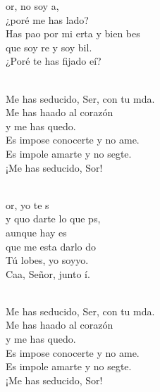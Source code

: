 \documentclass[12pt]{article}
\begin{document}
\begin{multicols*}{2}
\begin{cancion}%
	or, no soy a,  \\
	¿poré me has lado?\\
	Has pao por mi erta y bien bes\\
	que soy re y soy bil. \\
	¿Poré te has fijado eí? \\\jump\\
	\begin{chorus}%
	Me has seducido, Ser, con tu mda.\\
	Me has haado al corazón \\
	y me has quedo.\\
	Es impose conocerte y no ame.\\
	Es impole amarte y no segte.\\
	¡Me has seducido, Sor!\\
	\end{chorus}%
	\jump\\
	or, yo te s \\
	y quo darte lo que ps,\\
	aunque hay es \\
	que me esta darlo do\\
	Tú lobes, yo soyyo.\\
	Caa, Señor, junto í. \\\jump\\
	\begin{chorus}%
	Me has seducido, Ser, con tu mda.\\
	Me has haado al corazón \\
	y me has quedo.\\
	Es impose conocerte y no ame.\\
	Es impole amarte y no segte.\\
	¡Me has seducido, Sor!\\

\end{chorus}
\end{cancion}
\end{multicols*}
\end{document}
